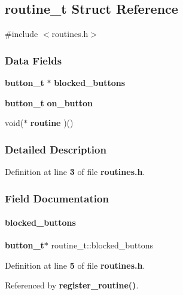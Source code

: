 \subsection{routine\+\_\+t Struct Reference}
\label{a00191}


{\ttfamily \#include $<$routines.\+h$>$}

\subsubsection*{Data Fields}
\begin{DoxyCompactItemize}
\item 
\textbf{ button\+\_\+t} $\ast$ \textbf{ blocked\+\_\+buttons}
\item 
\textbf{ button\+\_\+t} \textbf{ on\+\_\+button}
\item 
void($\ast$ \textbf{ routine} )()
\end{DoxyCompactItemize}


\subsubsection{Detailed Description}


Definition at line \textbf{ 3} of file \textbf{ routines.\+h}.



\subsubsection{Field Documentation}
\mbox{\label{a00191_a8d278c682e01bd513956f9902772812a}} 
\paragraph{blocked\+\_\+buttons}
{\footnotesize\ttfamily \textbf{ button\+\_\+t}$\ast$ routine\+\_\+t\+::blocked\+\_\+buttons}



Definition at line \textbf{ 5} of file \textbf{ routines.\+h}.



Referenced by \textbf{ register\+\_\+routine()}.

\mbox{\label{a00191_a4600cad285b5643e422cb5bfe6ce7fa4}} 
